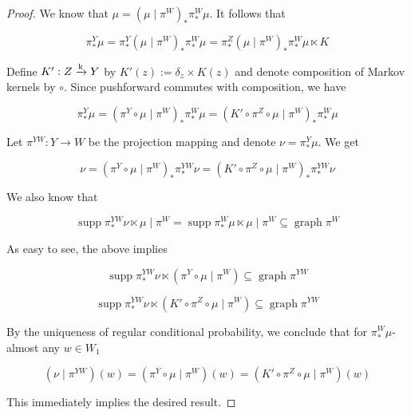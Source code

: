 \documentclass[aop,preprint]{imsart}
\numberwithin{equation}{section}
\theoremstyle{definition}
\theoremstyle{plain}
\newcommand{\M}{\xrightarrow{\textnormal{k}}}
\DeclareMathOperator{\Gr}{graph}
\DeclareMathOperator{\Sp}{supp}
\begin{document}
\begin{proof}

We know that $\mu = \left(\mu \mid \pi^W\right)_* \pi^W_* \mu$. It follows that

\[\pi^Y_*\mu = \pi^Y_* \left(\mu \mid \pi^W\right)_* \pi^W_* \mu = \pi^Z_*\left(\mu \mid \pi^W\right)_* \pi^W_* \mu \ltimes K\]

Define $K': Z \M Y$ by $K'(z):=\delta_z \times K(z)$ and denote composition of Markov kernels by $\circ$. Since pushforward commutes with composition, we have

\[\pi^Y_*\mu = \left(\pi^Y \circ\mu \mid \pi^W\right)_* \pi^W_* \mu = \left(K'  \circ \pi^Z \circ \mu \mid \pi^W\right)_* \pi^W_* \mu\]

Let $\pi^{YW}: Y \rightarrow W$ be the projection mapping and denote $\nu = \pi^Y_* \mu$. We get

\[\nu = \left(\pi^Y \circ\mu \mid \pi^W\right)_* \pi^{YW}_* \nu = \left(K'  \circ \pi^Z \circ \mu \mid \pi^W\right)_* \pi^{YW}_* \nu\]

We also know that

\[\Sp{\pi^{YW}_* \nu \ltimes \mu \mid \pi^W} = \Sp{\pi^{W}_* \mu \ltimes \mu \mid \pi^W \subseteq \Gr{\pi^W}}\]
 
As easy to see, the above implies

\[\Sp{\pi^{YW}_* \nu \ltimes \left(\pi^Y \circ\mu \mid \pi^W\right)} \subseteq \Gr{\pi^{YW}}\]

\[\Sp{\pi^{YW}_* \nu \ltimes \left(K'  \circ \pi^Z \circ \mu \mid \pi^W\right)} \subseteq \Gr{\pi^{YW}}\]

By the uniqueness of regular conditional probability, we conclude that for $\pi^W_* \mu$-almost any $w \in W_1$

\[\left(\nu \mid \pi^{YW}\right)(w)= \left(\pi^Y \circ\mu \mid \pi^W\right)(w) = \left(K'  \circ \pi^Z \circ \mu \mid \pi^W\right)(w)\]

This immediately implies the desired result.
\end{proof}
\end{document}
